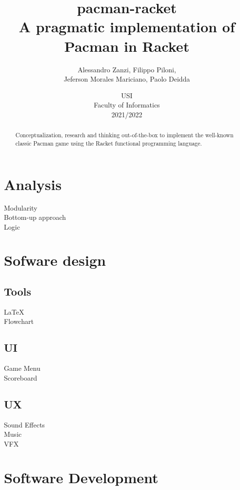 \documentclass{article}
\title{
\textbf{pacman-racket} \\
A pragmatic implementation of Pacman in Racket
}
\author{
    Alessandro Zanzi,
    Filippo Piloni,\\
    Jeferson Morales Mariciano,
    Paolo Deidda
}
\date{
USI \\
Faculty of Informatics \\
[\baselineskip]  2021/2022
}
\begin{document}
\begin{titlepage}
\maketitle

\end{titlepage}
 \begin{abstract}
Conceptualization, research and thinking out-of-the-box
to implement the well-known classic Pacman game
using the Racket functional programming language.
 \end{abstract}
\clearpage
 \tableofcontents
 \clearpage
 \section{Analysis}
 Modularity\\
 Bottom-up approach\\
 Logic

 \section{Sofware design}
 \subsection{Tools}
 \LaTeX \\
 Flowchart

 \subsection{UI}
 Game Menu\\
 Scoreboard

 \subsection{UX}
Sound Effects\\
Music\\
VFX

 \section{Software Development}
\end{document}
